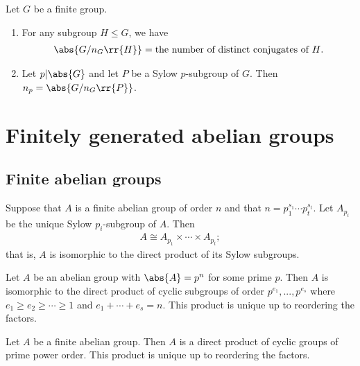 \documentclass{article}
\begin{document}
\begin{lemma}
  Let $G$ be a finite group.
  \begin{enumerate}
    \item For any subgroup $H\leq G$, we have
      \begin{align*}
        \abs{G/n_G\rr{H}}=\text{the number of distinct conjugates of $H$}.
      \end{align*}
    \item Let $p\vert \abs{G}$ and let $P$ be a Sylow $p$-subgroup of $G$. Then $n_p=\abs{G/n_G\rr{P}}$.
  \end{enumerate}
\end{lemma}

\section{Finitely generated abelian groups}\label{sec:finitely-generated-abelian-groups}

\subsection{Finite abelian groups}\label{sec:finite-abelian-groups}

\begin{theorem}
  Suppose that $A$ is a finite abelian group of order $n$ and that $n=p_1^{s_1}\cdots p_t^{s_t}$.
  Let $A_{p_i}$ be the unique Sylow $p_i$-subgroup of $A$. Then
  \begin{align*}
    A\cong A_{p_1}\times \cdots\times A_{p_t};
  \end{align*}
  that is, $A$ is isomorphic to the direct product of its Sylow subgroups.
\end{theorem}

\begin{theorem}
  Let $A$ be an abelian group with $\abs{A}=p^n$ for some prime $p$. Then $A$ is isomorphic
  to the direct product of cyclic subgroups of order $p^{e_1},...,p^{e_s}$ where
  $e_1\geq e_2\geq \cdots \geq 1$ and $e_1+\cdots+e_s=n$. This product is unique up to
  reordering the factors.
\end{theorem}

\begin{theorem}
  Let $A$ be a finite abelian group. Then $A$ is a direct product of cyclic groups of prime
  power order. This product is unique up to reordering the factors.
\end{theorem}
\end{document}
